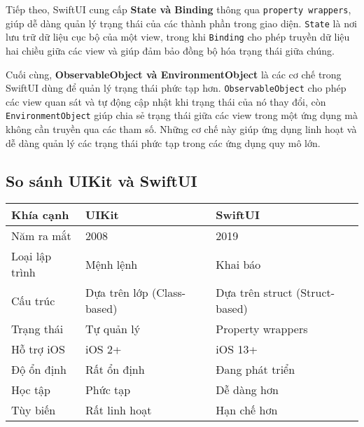 Tiếp theo, SwiftUI cung cấp \textbf{State và Binding} thông qua \texttt{property wrappers}, giúp dễ dàng quản lý trạng thái của các thành phần trong giao diện. \texttt{State} là nơi lưu trữ dữ liệu cục bộ của một view, trong khi \texttt{Binding} cho phép truyền dữ liệu hai chiều giữa các view và giúp đảm bảo đồng bộ hóa trạng thái giữa chúng.

Cuối cùng, \textbf{ObservableObject và EnvironmentObject} \cite{ObservableObject} là các cơ chế trong SwiftUI dùng để quản lý trạng thái phức tạp hơn. \texttt{ObservableObject} cho phép các view quan sát và tự động cập nhật khi trạng thái của nó thay đổi, còn \texttt{EnvironmentObject} giúp chia sẻ trạng thái giữa các view trong một ứng dụng mà không cần truyền qua các tham số. Những cơ chế này giúp ứng dụng linh hoạt và dễ dàng quản lý các trạng thái phức tạp trong các ứng dụng quy mô lớn.

\subsection{So sánh UIKit và SwiftUI}

\begin{center}
\begin{tabular}{|l|l|l|}
\hline
\textbf{Khía cạnh} & \textbf{UIKit} & \textbf{SwiftUI} \\
\hline
Năm ra mắt & 2008 & 2019 \\
\hline
Loại lập trình & Mệnh lệnh & Khai báo \\
\hline
Cấu trúc & Dựa trên lớp (Class-based) & Dựa trên struct (Struct-based) \\
\hline
Trạng thái & Tự quản lý & Property wrappers \\
\hline
Hỗ trợ iOS & iOS 2+ & iOS 13+ \\
\hline
Độ ổn định & Rất ổn định & Đang phát triển \\
\hline
Học tập & Phức tạp & Dễ dàng hơn \\
\hline
Tùy biến & Rất linh hoạt & Hạn chế hơn \\
\hline
\end{tabular}
\end{center}
